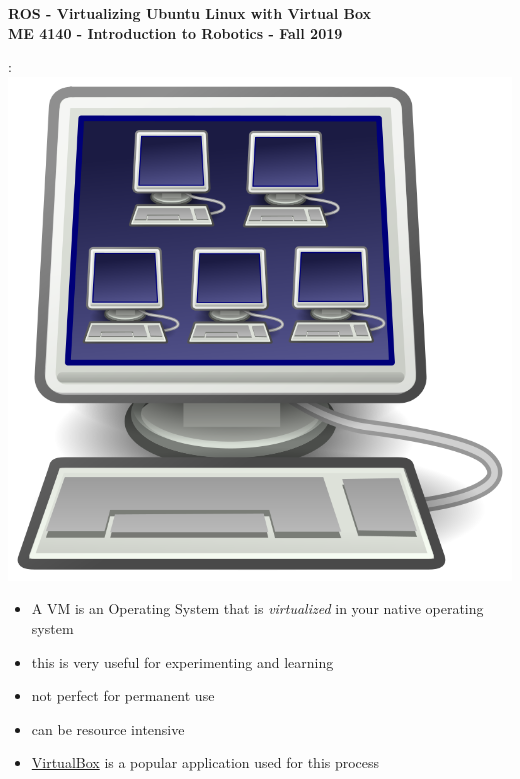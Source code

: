 \documentclass[12pt]{article}
\begin{document}
\thispagestyle{plain}

\begin{center}
   {\bf \Large ROS - Virtualizing Ubuntu Linux with Virtual Box}\vspace{3mm} \\
   {\bf \large ME 4140 - Introduction to Robotics - Fall 2019} \\
\end{center}


\begin{description}
	\vspace{5mm}
 	\item[What is a \href{https://en.wikipedia.org/wiki/Virtual_machine}{Virtual Machine} ?]: \vspace{5mm} \\
      		\includegraphics[scale=.4]{CaptureA.png}\\
            \begin{itemize}
                
                \item A VM is an Operating System that is {\it virtualized} in your native operating system
                \item this is very useful for experimenting and learning 
                \item not perfect for permanent use
                \item can be resource intensive
                \item \href{https://www.virtualbox.org/}{VirtualBox} is a popular application used for this process
                

\end{itemize}
\end{description}
\end{document}
